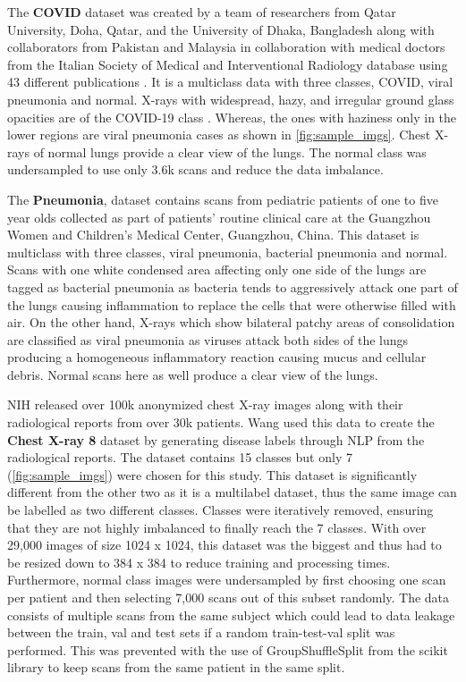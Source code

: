 \documentclass[10pt,twocolumn,letterpaper]{article}
\begin{document}
The \textbf{COVID} dataset was created by a team of researchers from Qatar University, Doha, 
Qatar, and the University of Dhaka, Bangladesh along with collaborators from Pakistan 
and Malaysia in collaboration with medical doctors from the Italian Society of Medical 
and Interventional Radiology database using 43 different 
publications \cite{RAHMAN2021104319,9144185,kagglecovid}. It is a multiclass data with 
three classes, COVID, viral pneumonia and normal. X-rays with widespread, hazy, 
and irregular ground glass opacities are of the COVID-19 class \cite{jacobi2020portable}. 
Whereas, the ones with haziness only in the lower regions \cite{zhan2021clinical} are 
viral pneumonia cases as shown in \cref{fig:sample_imgs}. Chest X-rays of normal lungs provide 
a clear view of the lungs. The normal class was undersampled to use only 3.6k scans and reduce the 
data imbalance.

The \textbf{Pneumonia}, dataset contains scans from pediatric patients of one to five year olds 
collected as part of patients' routine clinical care at the Guangzhou Women and Children's 
Medical Center, Guangzhou, China. \cite{kermany2018labeled,kagglepneu} 
This dataset is multiclass with three classes, viral pneumonia, bacterial pneumonia and normal.
Scans with one white condensed area affecting only one 
side of the lungs are tagged as bacterial pneumonia\cite{areviral} as bacteria tends to 
aggressively attack one part of the lungs causing inflammation to replace the cells 
that were otherwise filled with air. On the other hand, X-rays which 
show bilateral patchy areas of consolidation are classified as viral pneumonia
\cite{guo2012radiological} as viruses attack both sides of the lungs producing a 
homogeneous inflammatory reaction causing mucus and cellular debris. Normal scans here as well 
produce a clear view of the lungs. 

NIH released over 100k anonymized chest X-ray images along with 
their radiological reports from over 30k patients. Wang \etal \cite{wang2017chestx} 
used this data to create the \textbf{Chest X-ray 8} dataset by generating disease labels 
through NLP from the radiological reports. \cite{kaggle8} The dataset contains 15 classes but only 
7 (\cref{fig:sample_imgs}) were chosen for this study. This dataset is significantly different from the 
other two as it is a multilabel dataset, thus the same image can be labelled as two different 
classes. Classes were iteratively removed, ensuring that they are not highly imbalanced to finally 
reach the 7 classes. With over 29,000 images of size 
1024 x 1024, this dataset was the biggest and thus had to be resized down to 384 x 384 to 
reduce training and processing times. Furthermore, normal class images were undersampled by first
choosing one scan per patient and then selecting 7,000 scans out of this subset randomly. 
The data consists of multiple scans from the same subject which could lead to data leakage between 
the train, val and test sets if a random train-test-val split was performed. 
This was prevented with the use of GroupShuffleSplit from the scikit library to keep scans from the 
same patient in the same split. 
\end{document}
